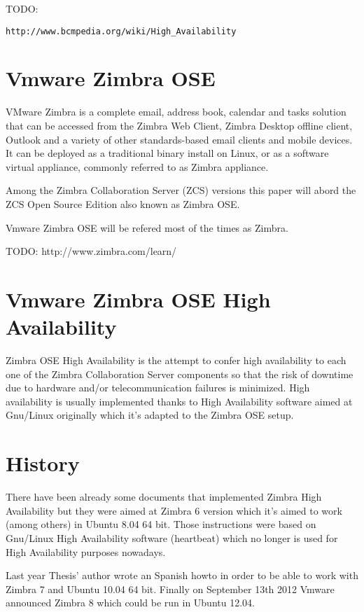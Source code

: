 TODO:
\begin{verbatim}
http://www.bcmpedia.org/wiki/High_Availability
\end{verbatim}



\section {Vmware Zimbra OSE}
VMware Zimbra is a complete email, address book, calendar and tasks solution that can be accessed from the Zimbra Web Client, Zimbra Desktop offline client, Outlook and a variety of other standards-based email clients and mobile devices. It can be deployed as a traditional binary install on Linux, or as a software virtual appliance, commonly referred to as Zimbra appliance.

Among the Zimbra Collaboration Server (ZCS) versions this paper will abord the ZCS Open Source Edition also known as Zimbra OSE.

Vmware Zimbra OSE will be refered most of the times as Zimbra.

TODO: http://www.zimbra.com/learn/

\section {Vmware Zimbra OSE High Availability}
Zimbra OSE High Availability is the attempt to confer high availability to each one of the Zimbra Collaboration Server components so that the risk of downtime due to hardware and/or telecommunication failures is minimized. High availability is usually implemented thanks to High Availability software aimed at Gnu/Linux originally which it's adapted to the Zimbra OSE setup.


\section{History}
There have been already some documents that implemented Zimbra High Availability but they were aimed at Zimbra 6 version which it's aimed to work (among others) in Ubuntu 8.04 64 bit. Those instructions were based on Gnu/Linux High Availability software (heartbeat) which no longer is used for High Availability purposes nowadays.

Last year Thesis' author wrote an Spanish howto in order to be able to work with Zimbra 7 and Ubuntu 10.04 64 bit. Finally on September 13th 2012 Vmware announced Zimbra 8 which could be run in Ubuntu 12.04.

